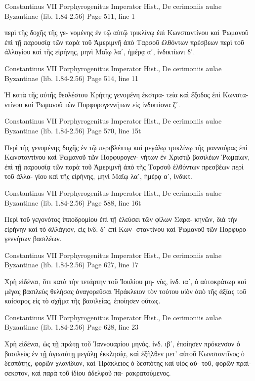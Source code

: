\documentclass[12pt,letterpaper,twoside,final]{memoir}
\begin{document}
\begin{greek}
Constantinus VII Porphyrogenitus Imperator Hist., De cerimoniis aulae Byzantinae (lib. 1.84-2.56) 
Page 511, line 1

                                    περὶ τῆς δοχῆς τῆς γε-
 νομένης ἐν τῷ αὐτῷ τρικλίνῳ ἐπὶ Κωνσταντίνου καὶ 
 Ῥωμανοῦ ἐπὶ τῇ παρουσίᾳ τῶν παρὰ τοῦ Ἀμεριμνῆ 
 ἀπὸ Ταρσοῦ ἐλθόντων πρέσβεων περὶ τοῦ ἀλλαγίου καὶ   
 τῆς εἰρήνης, μηνὶ Μαΐῳ λαʹ, ἡμέρᾳ αʹ, ἰνδικτίωνι δʹ. 



Constantinus VII Porphyrogenitus Imperator Hist., De cerimoniis aulae Byzantinae (lib. 1.84-2.56) 
Page 514, line 11

     Ἡ κατὰ τῆς αὐτῆς θεολέστου Κρήτης γενομένη ἐκστρα-
 τεία καὶ ἔξοδος ἐπὶ Κωνσταντίνου καὶ Ῥωμανοῦ τῶν 
 Πορφυρογεννήτων εἰς ἰνδικτίονα ζʹ. 



Constantinus VII Porphyrogenitus Imperator Hist., De cerimoniis aulae Byzantinae (lib. 1.84-2.56) 
Page 570, line 15t

Περὶ τῆς γενομένης δοχῆς ἐν τῷ περιβλέπτῳ καὶ μεγάλῳ τρικλίνῳ 
τῆς μανναύρας ἐπὶ Κωνσταντίνου καὶ Ῥωμανοῦ τῶν Πορφυρογεν-
νήτων ἐν Χριστῷ βασιλέων Ῥωμαίων, ἐπὶ τῇ παρουσίᾳ τῶν παρὰ 
τοῦ Ἀμεριμνῆ ἀπὸ τῆς Ταρσοῦ ἐλθόντων πρεσβέων περὶ τοῦ ἀλλα-
γίου καὶ τῆς εἰρήνης, μηνὶ Μαΐῳ λαʹ, ἡμέρᾳ αʹ, ἰνδικτ. 




Constantinus VII Porphyrogenitus Imperator Hist., De cerimoniis aulae Byzantinae (lib. 1.84-2.56) 
Page 588, line 16t

Περὶ τοῦ γεγονότος ἱπποδρομίου ἐπὶ τῇ ἐλεύσει τῶν φίλων Σαρα-
κηνῶν, διὰ τὴν εἰρήνην καὶ τὸ ἀλλάγιον, εἰς ἰνδ. δʹ ἐπὶ Κων-
σταντίνου καὶ Ῥωμανοῦ τῶν Πορφυρογεννήτων βασιλέων. 




Constantinus VII Porphyrogenitus Imperator Hist., De cerimoniis aulae Byzantinae (lib. 1.84-2.56) 
Page 627, line 17

Χρὴ εἰδέναι, ὅτι κατὰ τὴν τετάρτην τοῦ Ἰουλίου μη-
νὸς, ἰνδ. ιαʹ, ὁ αὐτοκράτωρ καὶ μέγας βασιλεὺς θελήσας 
ἀναγορεῦσαι Ἡράκλειον τὸν τούτου υἱὸν ἀπὸ τῆς ἀξίας τοῦ   
καίσαρος εἰς τὸ σχῆμα τῆς βασιλείας, ἐποίησεν οὕτως. 



Constantinus VII Porphyrogenitus Imperator Hist., De cerimoniis aulae Byzantinae (lib. 1.84-2.56) 
Page 628, line 23

Χρὴ εἰδέναι, ὡς τῇ πρώτῃ τοῦ Ἰαννουαρίου μηνὸς, ἰνδ.   
ιβʹ, ἐποίησεν πρόκενσον ὁ βασιλεὺς ἐν τῇ ἁγιωτάτῃ μεγάλῃ 
ἐκκλησίᾳ, καὶ ἐξῆλθεν μετ' αὐτοῦ Κωνσταντῖνος ὁ δεσπότης, 
φορῶν χλανίδιον, καὶ Ἡράκλειος ὁ δεσπότης καὶ υἱὸς αὐ-
τοῦ, φορῶν πραίσεκστον, καὶ παρὰ τοῦ ἰδίου ἀδελφοῦ πα-
ρακρατούμενος. 




\end{greek}
\end{document}

